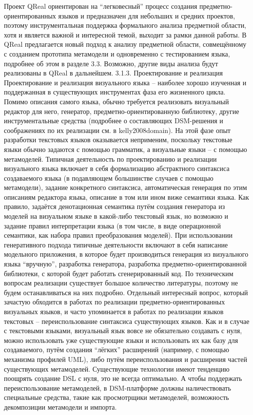 Проект QReal ориентирован на “легковесный” процесс создания предметно-ориентированных языков и предназначен для небольших и средних проектов, поэтому инструментальная поддержка формального анализа предметной области, хотя и является важной и интересной темой, выходит за рамки данной работы. В QReal предлагается новый подход к анализу предметной области, совмещённому с созданием прототипа метамодели и одновременно с тестированием языка, подробнее об этом в разделе 3.3. Возможно, другие виды анализа будут реализованы в QReal в дальнейшем.
3.1.3. Проектирование и реализация
	Проектирование и реализация визуального языка – наиболее хорошо изученная и поддержанная в существующих инструментах фаза его жизненного цикла. Помимо описания самого языка, обычно требуется реализовать визуальный редактор для него, генератор, предметно-ориентированную библиотеку, другие инструментальные средства (подробнее о составляющих DSM-решения и соображениях по их реализации см. в kelly2008domain). На этой фазе опыт разработки текстовых языков оказывается неприменим, поскольку текстовые языки обычно задаются с помощью грамматик, а визуальные языки – с помощью метамоделей.
	Типичная деятельность по проектированию и реализации визуального языка включает в себя формализацию абстрактного синтаксиса создаваемого языка (в подавляющем большинстве случаев с помощью метамодели), задание конкретного синтаксиса, автоматическая генерация по этим описаниям редактора языка, описание в том или ином виже семантики языка. Как правило, задаётся денотационная семантика путём создания генератора из моделей на визуальном языке в какой-либо текстовый язык, но возможно и задание правил интерпретации языка (в том числе, в виде операционной семантики, как набора правил преобразования моделей). При использовании генеративного подхода типичные деятельности включают в себя написание модельного приложения, в которое будет производиться генерация из визуального языка “вручную”, разработка генератора, разработка предметно-ориентированной библиотеки, с которой будет работать сгенерированный код. По техническим вопросам реализации существует большое количество литературы, поэтому не будем останавливаться на них подробно.
	Отдельный интересный вопрос, который зачастую обходится в работах по реализации предметно-ориентированных визуальных языков, и часто упоминается в работах по реализации языков текстовых – переиспользование синтаксиса существующих языков. Как и в случае с текстовыми языками, визуальный язык вовсе не обязательно создавать с нуля, можно использовать уже существующие языки и использовать их как базу для создаваемого, путём создания “лёгких” расширений (например, с помощью механизма профилей UML), либо путём переиспользования и расширения частей существующих метамоделей. Существующие технологии имеют тенденцию поощрять создание DSL с нуля, это не всегда оптимально. А чтобы поддержать переиспользование метамоделей, в DSM-платформе должны наличествовать специальные средства, такие как просмотрщики метамоделей, возможность декомпозиции метамодели и импорта.

